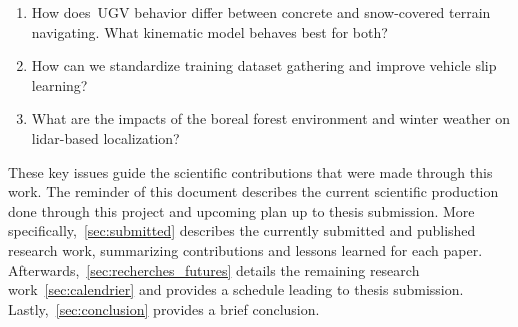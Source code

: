 \begin{enumerate}\bfseries
  	\item How does~\ac{UGV} behavior differ between concrete and snow-covered terrain navigating. What kinematic model behaves best for both?
  	\item How can we standardize training dataset gathering and improve vehicle slip learning?
	\item What are the impacts of the boreal forest environment and winter weather on lidar-based localization?
\end{enumerate}

These key issues guide the scientific contributions that were made through this work.
The reminder of this document describes the current scientific production done through this project and upcoming plan up to thesis submission.
More specifically,~\autoref{sec:submitted} describes the currently submitted and published research work, summarizing contributions and lessons learned for each paper. 
Afterwards,~\autoref{sec:recherches_futures} details the remaining research work~\autoref{sec:calendrier} and provides a schedule leading to thesis submission.
Lastly,~\autoref{sec:conclusion} provides a brief conclusion.
